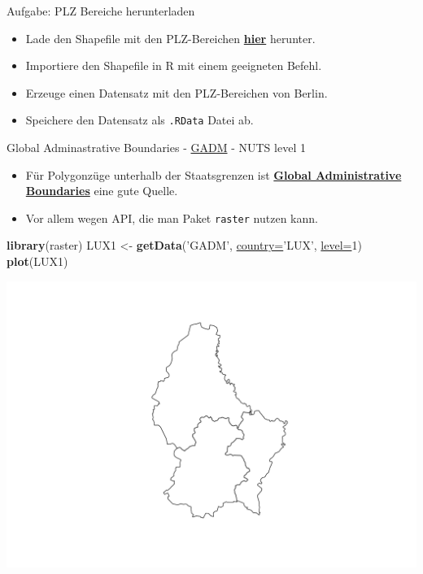 \documentclass[ignorenonframetext,]{beamer}
\newenvironment{Shaded}{\begin{snugshade}}{\end{snugshade}}
\newcommand{\KeywordTok}[1]{\textcolor[rgb]{0.26,0.66,0.93}{\textbf{#1}}}
\newcommand{\DataTypeTok}[1]{\textcolor[rgb]{0.74,0.68,0.62}{\underline{#1}}}
\newcommand{\DecValTok}[1]{\textcolor[rgb]{0.27,0.67,0.26}{#1}}
\newcommand{\StringTok}[1]{\textcolor[rgb]{0.02,0.61,0.04}{#1}}
\newcommand{\NormalTok}[1]{\textcolor[rgb]{0.74,0.68,0.62}{#1}}
\providecommand{\tightlist}{%
  \setlength{\itemsep}{0pt}\setlength{\parskip}{0pt}}
\begin{document}
\begin{frame}[fragile]{Aufgabe: PLZ Bereiche herunterladen}

\begin{itemize}
\tightlist
\item
  Lade den Shapefile mit den PLZ-Bereichen
  \href{http://arnulf.us/PLZ}{\textbf{hier}} herunter.
\item
  Importiere den Shapefile in R mit einem geeigneten Befehl.
\item
  Erzeuge einen Datensatz mit den PLZ-Bereichen von Berlin.
\item
  Speichere den Datensatz als \texttt{.RData} Datei ab.
\end{itemize}

\end{frame}

\begin{frame}[fragile]{Global Adminastrative Boundaries -
\href{http://www.gadm.org/}{GADM} - NUTS level 1}

\begin{itemize}
\tightlist
\item
  Für Polygonzüge unterhalb der Staatsgrenzen ist
  \href{http://www.gadm.org/}{\textbf{Global Administrative Boundaries}}
  eine gute Quelle.
\item
  Vor allem wegen API, die man Paket \texttt{raster} nutzen kann.
\end{itemize}

\begin{Shaded}
\begin{Highlighting}[]
\KeywordTok{library}\NormalTok{(raster)}
\NormalTok{LUX1 <-}\StringTok{ }\KeywordTok{getData}\NormalTok{(}\StringTok{'GADM'}\NormalTok{, }\DataTypeTok{country=}\StringTok{'LUX'}\NormalTok{, }\DataTypeTok{level=}\DecValTok{1}\NormalTok{)}
\KeywordTok{plot}\NormalTok{(LUX1)}
\end{Highlighting}
\end{Shaded}

\includegraphics{Geomedizin_files/figure-beamer/unnamed-chunk-147-1.pdf}

\end{frame}
\end{document}
